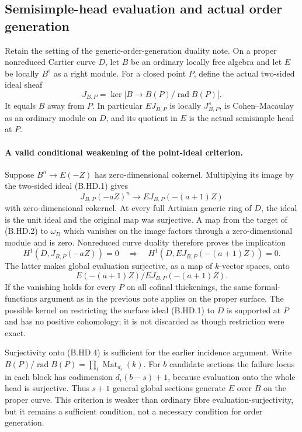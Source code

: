 \subsection*{Semisimple-head evaluation and actual order generation}

Retain the setting of the generic-order-generation duality note.  On a
proper nonreduced Cartier curve $D$, let $B$ be an ordinary locally free
algebra and let $E$ be locally $B^s$ as a right module.  For a closed
point $P$, define the actual two-sided ideal sheaf
\[
 J_{B,P}=\ker\bigl[B\longrightarrow
                   B(P)/\operatorname{rad}B(P)\bigr].    \tag{B.HD.1}
\]
It equals $B$ away from $P$.  In particular $EJ_{B,P}$ is locally
$J_{B,P}^s$, is Cohen--Macaulay as an ordinary module on $D$, and its
quotient in $E$ is the actual semisimple head at $P$.

\paragraph{A valid conditional weakening of the point-ideal criterion.}
Suppose $B^n\to E(-Z)$ has zero-dimensional cokernel.  Multiplying its
image by the two-sided ideal (B.HD.1) gives
\[
 J_{B,P}(-aZ)^n\longrightarrow EJ_{B,P}(-(a+1)Z)         \tag{B.HD.2}
\]
with zero-dimensional cokernel.  At every full Artinian generic ring
of $D$, the ideal is the unit ideal and the original map was
surjective.  A map from the target of (B.HD.2) to $\omega_D$ which
vanishes on the image factors through a zero-dimensional module and
is zero.  Nonreduced curve duality therefore proves the implication
\[
 H^1(D,J_{B,P}(-aZ))=0
 \quad\Longrightarrow\quad
 H^1(D,EJ_{B,P}(-(a+1)Z))=0.                            \tag{B.HD.3}
\]
The latter makes global evaluation surjective, as a map of
$k$-vector spaces, onto
\[
             E(-(a+1)Z)/EJ_{B,P}(-(a+1)Z).             \tag{B.HD.4}
\]
If the vanishing holds for every $P$ on all cofinal thickenings,
the same formal-functions argument as in the previous note applies
on the proper surface.  The possible kernel on restricting the
surface ideal (B.HD.1) to $D$ is supported at $P$ and has no positive
cohomology; it is not discarded as though restriction were exact.

Surjectivity onto (B.HD.4) is sufficient for the earlier incidence
argument.  Write $B(P)/\operatorname{rad}B(P)=\prod_i\operatorname{Mat}_{d_i}(k)$.
For $b$ candidate sections the failure locus in each block has
codimension $d_i(b-s)+1$, because evaluation onto the whole head is
surjective.  Thus $s+1$ general global sections generate $E$ over $B$
on the proper curve.  This criterion is weaker than ordinary fibre
evaluation-surjectivity, but it remains a sufficient condition, not
a necessary condition for order generation.

